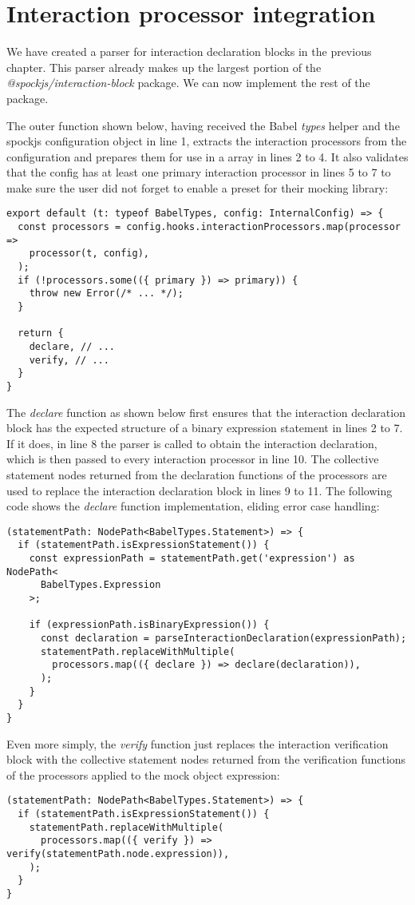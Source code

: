 \section{Interaction processor integration}
We have created a parser for
interaction declaration blocks
in the previous chapter.
This parser already makes up the largest portion of the
\textit{@spockjs/interaction-block} package.
We can now implement the rest of the package.

The outer function shown below,
having received the Babel \textit{types} helper
and the spockjs configuration object in line 1,
extracts the interaction processors from the configuration
and prepares them for use in a  array in lines 2 to 4.
It also validates that the config has at least one
primary interaction processor in lines 5 to 7
to make sure the user did not forget
to enable a preset for their mocking library:
\begin{verbatim}
export default (t: typeof BabelTypes, config: InternalConfig) => {
  const processors = config.hooks.interactionProcessors.map(processor =>
    processor(t, config),
  );
  if (!processors.some(({ primary }) => primary)) {
    throw new Error(/* ... */);
  }

  return {
    declare, // ...
    verify, // ...
  }
}
\end{verbatim}

The \textit{declare} function as shown below
first ensures that the interaction declaration block
has the expected structure of a binary expression statement
in lines 2 to 7.
If it does, in line 8 the parser is called
to obtain the interaction declaration,
which is then passed to every
interaction processor in line 10.
The collective statement nodes returned from
the declaration functions of the processors
are used to replace the interaction declaration block
in lines 9 to 11.
The following code shows the \textit{declare} function implementation,
eliding error case handling:
\begin{verbatim}
(statementPath: NodePath<BabelTypes.Statement>) => {
  if (statementPath.isExpressionStatement()) {
    const expressionPath = statementPath.get('expression') as NodePath<
      BabelTypes.Expression
    >;

    if (expressionPath.isBinaryExpression()) {
      const declaration = parseInteractionDeclaration(expressionPath);
      statementPath.replaceWithMultiple(
        processors.map(({ declare }) => declare(declaration)),
      );
    }
  }
}
\end{verbatim}

Even more simply,
the \textit{verify} function just replaces the interaction verification block
with the collective statement nodes returned from
the verification functions of the processors
applied to the mock object expression:
\begin{verbatim}
(statementPath: NodePath<BabelTypes.Statement>) => {
  if (statementPath.isExpressionStatement()) {
    statementPath.replaceWithMultiple(
      processors.map(({ verify }) => verify(statementPath.node.expression)),
    );
  }
}
\end{verbatim}
